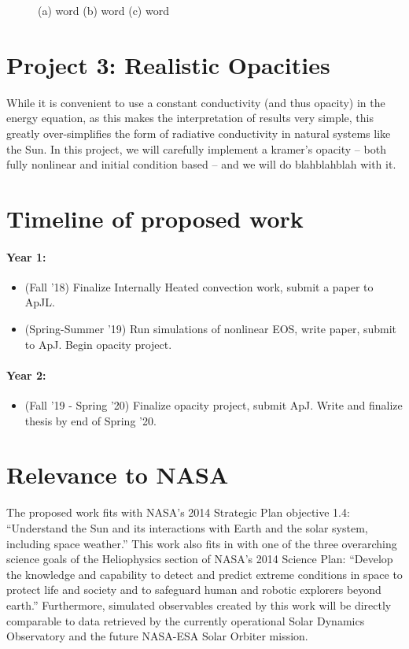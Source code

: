 \documentclass[aasms,12pt]{article}
\begin{document}
\begin{figure}[t!]
\centering
\caption{(a) word (b) word (c) word
	\label{fig:fig2}}
\end{figure}

\section{Project 3: Realistic Opacities}
While it is convenient to use a constant conductivity (and thus opacity) in the energy
equation, as this makes the interpretation of results very simple, this greatly 
over-simplifies the form of radiative conductivity in natural systems like the Sun.
In this project, we will carefully implement a kramer's opacity -- both fully nonlinear
and initial condition based -- and we will do blahblahblah with it.

\section{Timeline of proposed work}
\paragraph{Year 1:}
\begin{itemize}
\item (Fall '18) Finalize Internally Heated convection work, submit a paper to ApJL.
\item (Spring-Summer '19) Run simulations of nonlinear EOS, write paper, submit to ApJ.
Begin opacity project.
\end{itemize}

\paragraph{Year 2:}
\begin{itemize}
\item (Fall '19 - Spring '20) Finalize opacity project, submit ApJ.  Write and
finalize thesis by end of Spring '20.
\end{itemize}

\newpage

\section{Relevance to NASA} 
The proposed work fits with NASA's 2014 Strategic Plan objective
1.4:
``Understand the Sun and its interactions with Earth and the solar
system, including space weather.''
This work also fits in with one of the three overarching science goals
of the Heliophysics section of NASA's 2014 Science Plan: 
``Develop the
knowledge and capability to detect and predict extreme conditions in space to
protect life and society and to safeguard human and robotic explorers beyond
earth.''  Furthermore, simulated observables created by this work will be
directly comparable to data retrieved by the currently operational Solar
Dynamics Observatory and the future NASA-ESA Solar Orbiter mission.
\end{document}
